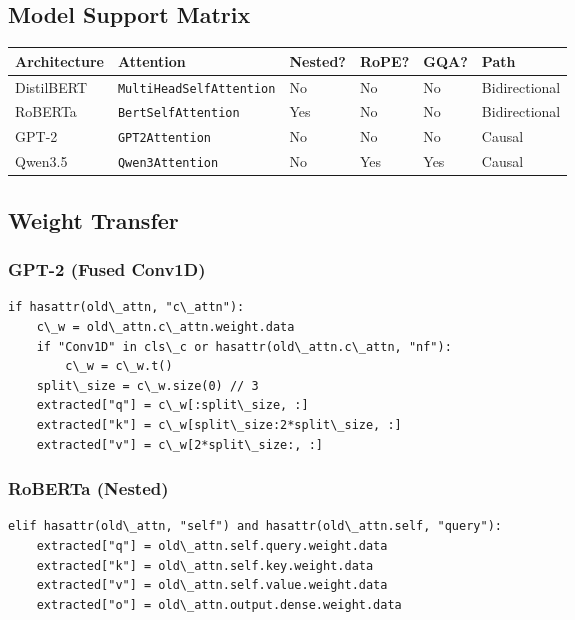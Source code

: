 \subsection{Model Support Matrix}

\begin{table}[H]
\centering
\small
\begin{tabular}{llllll}
\toprule
\textbf{Architecture} & \textbf{Attention} & \textbf{Nested?} & \textbf{RoPE?} & \textbf{GQA?} & \textbf{Path} \\
\midrule
DistilBERT & \texttt{MultiHeadSelfAttention} & No & No & No & Bidirectional \\
RoBERTa & \texttt{BertSelfAttention} & Yes & No & No & Bidirectional \\
GPT-2 & \texttt{GPT2Attention} & No & No & No & Causal \\
Qwen3.5 & \texttt{Qwen3Attention} & No & Yes & Yes & Causal \\
\bottomrule
\end{tabular}
\end{table}

\subsection{Weight Transfer}

\subsubsection{GPT-2 (Fused Conv1D)}

\begin{lstlisting}
if hasattr(old\_attn, "c\_attn"):
    c\_w = old\_attn.c\_attn.weight.data
    if "Conv1D" in cls\_c or hasattr(old\_attn.c\_attn, "nf"):
        c\_w = c\_w.t()
    split\_size = c\_w.size(0) // 3
    extracted["q"] = c\_w[:split\_size, :]
    extracted["k"] = c\_w[split\_size:2*split\_size, :]
    extracted["v"] = c\_w[2*split\_size:, :]
\end{lstlisting}

\subsubsection{RoBERTa (Nested)}

\begin{lstlisting}
elif hasattr(old\_attn, "self") and hasattr(old\_attn.self, "query"):
    extracted["q"] = old\_attn.self.query.weight.data
    extracted["k"] = old\_attn.self.key.weight.data
    extracted["v"] = old\_attn.self.value.weight.data
    extracted["o"] = old\_attn.output.dense.weight.data
\end{lstlisting}

